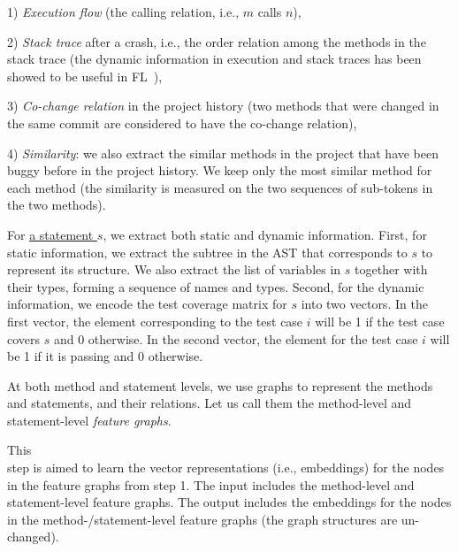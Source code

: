 1) {\em Execution flow} (the calling relation, i.e., $m$ calls $n$),

2) {\em Stack trace} after a crash, i.e., the order relation among the
methods in the stack trace (the dynamic information in execution
and stack traces has been showed to be useful in
FL~\cite{icse21-fl,DeepFL}),

3) {\em Co-change relation} in the project history (two methods
that were changed in the same commit are considered to have the
co-change relation),

4) {\em Similarity}: we also extract the similar methods in the project that
have been buggy before in the project history. We keep only the most
similar method for each method (the similarity is measured on the two
sequences of sub-tokens in the two methods).

For \underline{a statement $s$}, we extract both static and dynamic
information. First, for static information, we extract the subtree in
the AST that corresponds to $s$ to represent its structure. We also
extract the list of variables in $s$ together with their types,
forming a sequence of names and types. Second, for the dynamic
information, we encode the test coverage matrix for $s$ into two
vectors. In the first vector, the element corresponding to the test
case $i$ will be 1 if the test case covers $s$ and 0 otherwise. In the
second vector, the element for the test case $i$ will be 1 if it is
passing and 0 otherwise.

At both method and statement levels, we use graphs to represent
the methods and statements, and their relations. Let us call
them the method-level and statement-level {\em feature graphs}.

  This\\ step is aimed to learn the vector
representations (i.e., embeddings) for the nodes in the feature graphs
from step 1. The input includes the method-level and statement-level
feature graphs. The output includes the embeddings for the nodes in
the method-/statement-level feature graphs (the graph structures are
un-changed).



